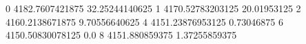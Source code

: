 0 4182.7607421875 32.25244140625
1 4170.52783203125 20.01953125
2 4160.2138671875 9.70556640625
4 4151.23876953125 0.73046875
6 4150.50830078125 0.0
8 4151.880859375 1.37255859375
